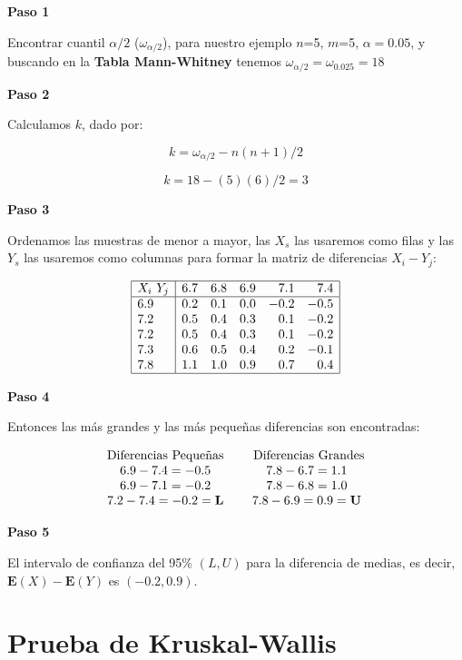 \documentclass[
  a4paper,
  oneside,
  openany]{book}
\begin{document}
\textbf{Paso 1}

Encontrar cuantil \(\alpha/2\) (\(\omega_{\alpha/2}\)), para nuestro ejemplo \(n\)=5, \(m\)=5, \(\alpha=0.05\), y buscando en la \textbf{Tabla Mann-Whitney} tenemos \(\omega_{\alpha/2}=\omega_{0.025}=18\)

\textbf{Paso 2}

Calculamos \(k\), dado por:

\[k= \omega_{\alpha/2}-n(n+1)/2\]

\[k=18-(5)(6)/2=3\]

\textbf{Paso 3}

Ordenamos las muestras de menor a mayor, las \(X_s\) las usaremos como filas y las \(Y_s\) las usaremos como columnas para formar la matriz de diferencias \(X_{i}-Y_{j}\):

\[
\begin{array}{|l| r r r r r|}
\hline
X_{i} \ Y_{j} & 6.7 & 6.8 & 6.9 & 7.1 & 7.4 \\
\hline
6.9 & 0.2 & 0.1 & 0.0 & -0.2 & -0.5 \\
7.2 & 0.5 & 0.4 & 0.3 &  0.1 & -0.2 \\
7.2 & 0.5 & 0.4 & 0.3 &  0.1 & -0.2 \\
7.3 & 0.6 & 0.5 & 0.4 &  0.2 & -0.1 \\
7.8 & 1.1 & 1.0 & 0.9 &  0.7 &  0.4 \\
\hline
\end{array}
\]

\textbf{Paso 4}

Entonces las más grandes y las más pequeñas diferencias son encontradas:

\[
\begin{array}{c c c c}
\mbox{Diferencias Pequeñas} & & \mbox{ Diferencias Grandes} \\
6.9 - 7.4 = -0.5 & & 7.8 - 6.7 = 1.1\\
6.9 - 7.1 = -0.2 & & 7.8 - 6.8 = 1.0\\
7.2 - 7.4 = -0.2 = \textbf{L} & & 7.8 - 6.9 = 0.9 = \textbf{U}\\
\end{array}
\]

\textbf{Paso 5}

El intervalo de confianza del 95\% \((L,U)\) para la diferencia de medias, es decir, \(\mathbf{E}(X)-\mathbf{E}(Y)\) es \((-0.2,0.9)\).

\hypertarget{prueba-de-kruskal-wallis}{%
\chapter{Prueba de Kruskal-Wallis}\label{prueba-de-kruskal-wallis}}
\end{document}
